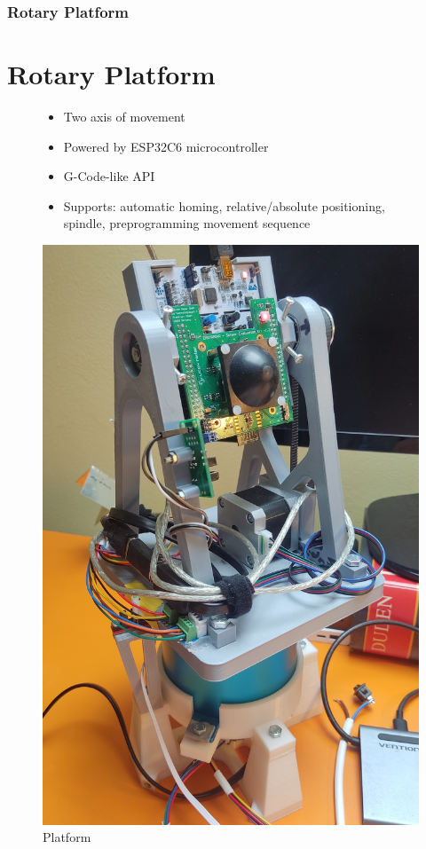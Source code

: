 \documentclass[aspectratio=43]{beamer}
\begin{document}
\begin{frame}[fragile]
  \frametitle{Rotary Platform}
  \section{Rotary Platform}
  \begin{figure}[!htb]
    \begin{minipage}{0.48\textwidth}
      \begin{itemize}
        \item Two axis of movement
        \item Powered by ESP32C6 microcontroller
        \item G-Code-like API
        \item Supports: automatic homing, relative/absolute positioning, spindle, preprogramming movement sequence
      \end{itemize}
    \end{minipage}\hfill
    \begin{minipage}{0.48\textwidth}
      \centering
      \includegraphics[width=.8\linewidth]{../img/assembly_photo.jpg}
      \caption{Platform}
    \end{minipage}
  \end{figure}
\end{frame}
\end{document}
